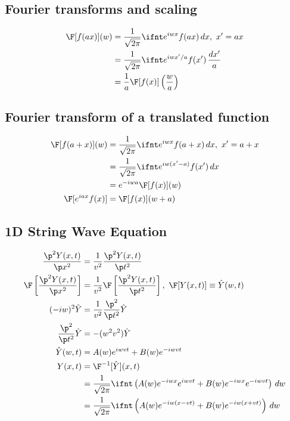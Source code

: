 \documentclass[cplx.tex]{subfiles}
\begin{document}
\subsection{Fourier transforms and scaling}
\begin{align}
    \F[f(ax)](w) &= \frac{1}{\sqrt{2\pi}} \ifnt e^{iwx}f(ax)\,dx,~ x' = ax \\
                 &= \frac{1}{\sqrt{2\pi}} \ifnt e^{iwx'/a}f(x')\,\frac{dx'}{a} \\
                 &= \frac{1}{a}\F[f(x)]\left(\frac{w}{a}\right)
\end{align}

\subsection{Fourier transform of a translated function}
\begin{align}
    \F[f(a+x)](w) &= \frac{1}{\sqrt{2\pi}} \ifnt e^{iwx}f(a+x)\,dx,~ x' = a+x \\
                  &= \frac{1}{\sqrt{2\pi}} \ifnt e^{iw(x'-a)}f(x')\,dx \\
                  &= e^{-iwa}\F[f(x)](w) \\
    \F[e^{iax}f(x)] &= \F[f(x)](w+a)
\end{align}

\subsection{1D String Wave Equation}
\begin{align}
    \frac{\p^2Y(x,t)}{\p x^2} &= \frac{1}{v^2}\frac{\p^2 Y(x,t)}{\p t^2} \\
    \F\left[\frac{\p^2Y(x,t)}{\p x^2}\right] &= \frac{1}{v^2}\F\left[\frac{\p^2Y(x,t)}{\p t^2}\right],~ \F[Y(x,t)] \equiv \hat{Y}(w,t) \\
    (-iw)^2\hat{Y} &= \frac{1}{v^2}\frac{\p^2}{\p t^2}\hat{Y} \\
    \frac{\p^2}{\p t^2} \hat{Y} &= -(w^2v^2)\hat{Y}  \\
    \hat{Y}(w,t) &= A(w)e^{iwvt} + B(w)e^{-iwvt} \\
    Y(x,t) &= \F^{-1}[\hat{Y}](x,t) \\
           &= \frac{1}{\sqrt{2\pi}} \ifnt \left(A(w)e^{-iwx}e^{iwvt} + B(w)e^{-iwx}e^{-iwvt}\right)\,dw \\
           &= \frac{1}{\sqrt{2\pi}} \ifnt \left(A(w)e^{-iw(x-vt)} + B(w)e^{-iw(x+vt)}\right)\,dw
\end{align}
\end{document}
